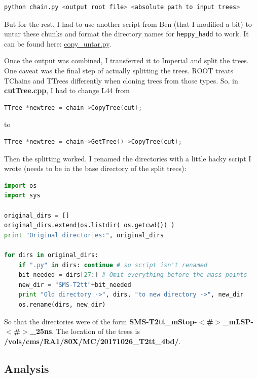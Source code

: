 \begin{lstlisting}[belowskip=-0.7cm, language=sh, numbers=none]
python chain.py <output root file> <absolute path to input trees>
\end{lstlisting}

But for the rest, I had to use another script from Ben (that I modified a bit) to untar these chunks and format the directory names for \texttt{heppy\_hadd} to work. It can be found here: \href{run:sec31/copy_untar.py}{copy\_untar.py}.

Once the output was combined, I transferred it to Imperial and split the trees. One caveat was the final step of actually splitting the trees. ROOT treats TChains and TTrees differently when cloning trees from those types. So, in \textbf{cutTree.cpp}, I had to change L44 from

\begin{lstlisting}[belowskip=-0.7cm, language=C++, numbers=none]
TTree *newtree = chain->CopyTree(cut);
\end{lstlisting}

to

\begin{lstlisting}[belowskip=-0.7cm, language=C++, numbers=none]
TTree *newtree = chain->GetTree()->CopyTree(cut);
\end{lstlisting}

Then the splitting worked. I renamed the directories with a little hacky script I wrote (needs to be in the base directory of the split trees):

\begin{lstlisting}[belowskip=-0.7cm, language=python, numbers=none]
import os
import sys

original_dirs = []
original_dirs.extend(os.listdir( os.getcwd()) )
print "Original directories:", original_dirs

for dirs in original_dirs:
    if ".py" in dirs: continue # so script isn't renamed
    bit_needed = dirs[27:] # Omit everything before the mass points
    new_dir = "SMS-T2tt"+bit_needed
    print "Old directory ->", dirs, "to new directory ->", new_dir
    os.rename(dirs, new_dir)
\end{lstlisting}

So that the directories were of the form \textbf{SMS-T2tt\_mStop-$<$\#$>$\_mLSP-$<$\#$>$\_25ns}. The location of the trees is \textbf{/vols/cms/RA1/80X/MC/20171026\_T2tt\_4bd/}.


\subsection{Analysis}

